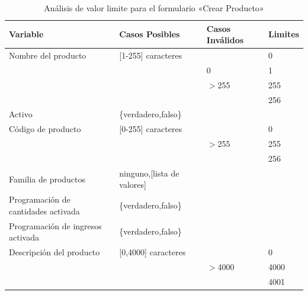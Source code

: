 \begin{table}[H]
\centering
\begin{tabular}{|p{6.0cm}|l|l|l|}
\hline
\footnotesize{\textbf{Variable}} & \footnotesize{\textbf{Casos Posibles}} & \footnotesize{\textbf{Casos Inválidos}} & \footnotesize{\textbf{Limites}} \\
\hline
\footnotesize{Nombre del producto} & \footnotesize{[1-255] caracteres} & & \footnotesize{0} \\
& & \footnotesize{0} & \footnotesize{1} \\
& & \footnotesize{$>$255} & \footnotesize{255} \\
& & & \footnotesize{256} \\
\hline
\footnotesize{Activo} & \footnotesize{\{verdadero,falso\}} & & \\
\hline
\footnotesize{Código de producto} & \footnotesize{[0-255] caracteres} & & \footnotesize{0} \\
& & \footnotesize{$>$255} & \footnotesize{255} \\
& & & \footnotesize{256} \\
\hline
\footnotesize{Familia de productos} & \footnotesize{ninguno,[lista de valores]} & & \\
\hline
\footnotesize{Programación de cantidades activada} & \footnotesize{\{verdadero,falso\}} & & \\
\hline
\footnotesize{Programación de ingresos activada} & \footnotesize{\{verdadero,falso\}} & & \\
\hline
\footnotesize{Descripción del producto} & \footnotesize{[0,4000] caracteres} & & \footnotesize{0} \\
& & \footnotesize{$>$4000} & \footnotesize{4000} \\
& & & \footnotesize{4001} \\
\hline
\end{tabular}
\caption{Análisis de valor limite para el formulario «Crear Producto»}
\label{myers_01}
\end{table}

